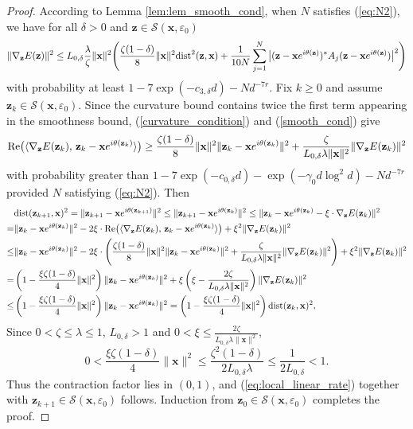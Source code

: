 \documentclass{article}
\renewcommand{\eqref}[1]{(\ref{#1})}
\newcommand{\calS}{{\mathcal S}}
\newcommand{\re}{{\rm Re}}
\newcommand{\dist}{{\rm dist}}
\newcommand{\vx}{{\mathbf x}}
\newcommand{\vz}{{\mathbf z}}
\newcommand{\0}{{\mathbf 0}}
\numberwithin{equation}{section}
\begin{document}
\begin{proof}
		According to Lemma \ref{lem:lem_smooth_cond}, 
		when $ N $ satisfies \eqref{eq:N2}, we have for all $\delta>0$ and $\vz\in\calS(\vx,\varepsilon_0)$
		\begin{equation}	\label{smooth_cond}
			\|\nabla_{\vz} E(\vz)\|^2
			\leq L_{0,\delta}\frac{\lambda}{\zeta}\|\vx\|^2\Bigg(\frac{\zeta(1-\delta)}{8}\|\vx\|^2\dist^2(\vz, \vx)+\frac{1}{10N}\sum_{j=1}^{N}\big|(\vz-\vx e^{i\theta(\vz)})^*A_j(\vz-\vx e^{i\theta(\vz)})\big|^2\Bigg)
		\end{equation}
		with probability at least $ 1-7\exp(-c_{3,\delta} d) -Nd^{-7r}$. 
		Fix $k\ge0$ and assume $\vz_k\in\calS(\vx,\varepsilon_0)$. Since the curvature bound contains twice the first term appearing in the smoothness bound, \eqref{curvature_condition} and \eqref{smooth_cond} give
		\[
		\re\big(\langle\nabla_{\vz} E(\vz_k),\,\vz_k-\vx e^{i\theta(\vz_k)}\rangle\big)\geq\frac{\zeta(1-\delta)}{8}\|\vx\|^2\|\vz_k-\vx e^{i\theta(\vz_k)}\|^2+\frac{\zeta}{L_{0,\delta}\lambda\|\vx\|^2}\|\nabla_{\vz} E(\vz_k)\|^2
		\]
		with probability greater than  $ 1-7\exp(-c_{0,\delta} d)-\exp(-\gamma_0d\log^2d)-Nd^{-7r}$ provided $ N $ satisfying \eqref{eq:N2}. 
		\noindent
		Then 
		\begin{align*}
			&\dist(\vz_{k+1},\vx)^2=\|\vz_{k+1}-\vx e^{i\theta(\vz_{k+1})}\|^2
			\le\|\vz_{k+1}-\vx e^{i\theta(\vz_k)}\|^2
			\le\|\vz_k-\vx e^{i\theta(\vz_k)}-\xi\cdot\nabla_{\vz} E(\vz_k)\|^2\\
			=&\|\vz_k-\vx e^{i\theta(\vz_k)}\|^2-2\xi\cdot\re\big(\langle\nabla_{\vz} E(\vz_k),\,\vz_k-\vx e^{i\theta(\vz_k)}\rangle\big)+\xi^2\|\nabla_{\vz} E(\vz_k)\|^2\\
			\le&\|\vz_k-\vx e^{i\theta(\vz_k)}\|^2-2\xi\cdot\Bigg(\frac{\zeta(1-\delta)}{8}\|\vx\|^2\|\vz_k-\vx e^{i\theta(\vz_k)}\|^2+\frac{\zeta}{L_{0,\delta}\lambda\|\vx\|^2}\|\nabla_{\vz} E(\vz_k)\|^2\Bigg)+\xi^2\|\nabla_{\vz}E(\vz_k)\|^2\\
			=&\left(1-\frac{\xi\zeta(1-\delta)}{4}\|\vx\|^2\right)\|\vz_k-\vx e^{i\theta(\vz_k)}\|^2+\xi\left(\xi-\frac{2\zeta}{L_{0,\delta}\lambda\|\vx\|^2}\right)\|\nabla_{\vz}E(\vz_k)\|^2\\
			\leq&\left(1-\frac{\xi\zeta(1-\delta)}{4}\|\vx\|^2\right)\|\vz_k-\vx e^{i\theta(\vz_k)}\|^2=\left(1-\frac{\xi\zeta(1-\delta)}{4}\|\vx\|^2\right)\dist(\vz_k,\vx)^2,
		\end{align*}
		Since  $0<\zeta\le\lambda\le1$, $L_{0,\delta}>1$ and $0<\xi\le\frac{2\zeta}{L_{0,\delta}\lambda\|\vx\|^2}$,
		\[
		0<\frac{\xi\zeta(1-\delta)}4\|\vx\|^2
		\le\frac{\zeta^2(1-\delta)}{2L_{0,\delta}\lambda}
		\le\frac1{2L_{0,\delta}}<1.
		\]
		Thus the contraction factor lies in $(0,1)$, and \eqref{eq:local_linear_rate} together with $\vz_{k+1}\in\calS(\vx,\varepsilon_0)$ follows. Induction from $\vz_0\in\calS(\vx,\varepsilon_0)$ completes the proof.
	\end{proof}
\end{document}
